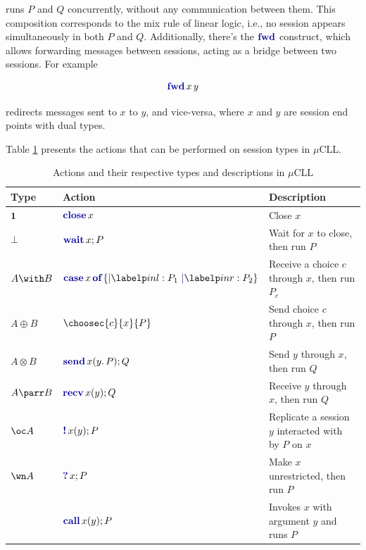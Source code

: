 runs $P$ and $Q$ concurrently, without any communication between them. This composition corresponds to the mix rule of linear logic, i.e., no session appears simultaneously in both $P$ and $Q$. Additionally, there's the $\fwdp$ construct, which allows forwarding messages between sessions, acting as a bridge between two sessions. For example

$$
    \fwdc{x}{y}
$$

redirects messages sent to $x$ to $y$, and vice-versa, where $x$ and $y$ are session end points with dual types.

Table \ref{tab:muCLLActions} presents the actions that can be performed on session types in $\mu$CLL.

\begin{table}
    \centering
    \caption{Actions and their respective types and descriptions in $\mu$CLL}
    \label{tab:muCLLActions}
    \begin{tabular}{lll}
        \toprule
        Type          & Action                                            & Description                                           \\
        \midrule
        $\mathbf{1}$  & $\closec{x}$                                      & Close $x$                                             \\
        $\bot$        & $\waitc{x}{P}$                                    & Wait for $x$ to close, then run $P$                   \\
        $A \with B$   & $\casec{x}{\labelc{inl}{P_1}\ \labelc{inr}{P_2}}$ & Receive a choice $c$ through $x$, then run $P_c$      \\
        $A \oplus B$  & $\choosec{c}{x}{P}$                               & Send choice $c$ through $x$, then run $P$             \\
        $A \otimes B$ & $\sendc{x}{y}{P}{Q}$                              & Send $y$ through $x$, then run $Q$                    \\
        $A \parr B$   & $\recvc{x}{y}{Q}$                                 & Receive $y$ through $x$, then run $Q$                 \\
        $\oc A$       & $\bangc{x}{y}{P}$                                 & Replicate a session $y$ interacted with by $P$ on $x$ \\
        $\wn A$       & $\whynotc{x}{P}$                                  & Make $x$ unrestricted, then run $P$                   \\
                      & $\callc{x}{y}{P}$                                 & Invokes $x$ with argument $y$ and runs $P$            \\

\end{tabular}
\end{table}
